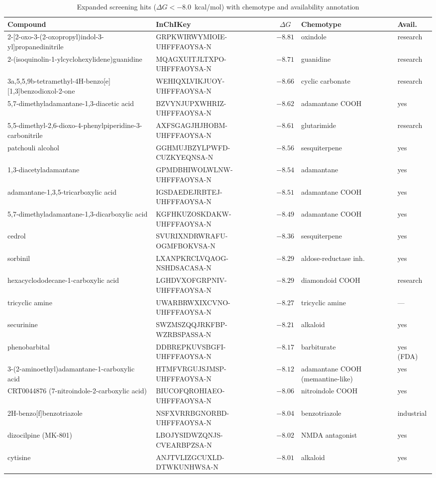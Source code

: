 \documentclass[pdflatex,sn-nature]{sn-jnl}
\begin{document}
\begin{table}[t]
\centering
\footnotesize
\caption{Expanded screening hits ($\Delta G < -8.0$~kcal/mol) with chemotype and availability annotation}
\label{tab:expanded}
\begin{tabular}{@{}p{4.6cm}p{3.6cm}cp{2.6cm}p{1.5cm}@{}}
\toprule
Compound & InChIKey & $\Delta G$ & Chemotype & Avail. \\
\midrule
2-[2-oxo-3-(2-oxopropyl)indol-3-yl]propanedinitrile & GRPKWIRWYMIOIE-UHFFFAOYSA-N & $-8.81$ & oxindole & research \\
2-(isoquinolin-1-ylcyclohexylidene)guanidine & MQAGXUITJLTXPO-UHFFFAOYSA-N & $-8.71$ & guanidine & research \\
3a,5,5,9b-tetramethyl-4H-benzo[e][1,3]benzodioxol-2-one & WEHIQXLVIKJUOY-UHFFFAOYSA-N & $-8.66$ & cyclic carbonate & research \\
5,7-dimethyladamantane-1,3-diacetic acid & BZVYNJUPXWHRIZ-UHFFFAOYSA-N & $-8.62$ & adamantane COOH & yes \\
5,5-dimethyl-2,6-dioxo-4-phenylpiperidine-3-carbonitrile & AXFSGAGJHJHOBM-UHFFFAOYSA-N & $-8.61$ & glutarimide & research \\
patchouli alcohol & GGHMUJBZYLPWFD-CUZKYEQNSA-N & $-8.56$ & sesquiterpene & yes \\
1,3-diacetyladamantane & GPMDBHIWOLWLNW-UHFFFAOYSA-N & $-8.54$ & adamantane & yes \\
adamantane-1,3,5-tricarboxylic acid & IGSDAEDEJRBTEJ-UHFFFAOYSA-N & $-8.51$ & adamantane COOH & yes \\
5,7-dimethyladamantane-1,3-dicarboxylic acid & KGFHKUZOSKDAKW-UHFFFAOYSA-N & $-8.49$ & adamantane COOH & yes \\
cedrol & SVURIXNDRWRAFU-OGMFBOKVSA-N & $-8.36$ & sesquiterpene & yes \\
sorbinil & LXANPKRCLVQAOG-NSHDSACASA-N & $-8.29$ & aldose-reductase inh. & yes \\
hexacyclododecane-1-carboxylic acid & LGHDVXOFGRPNIV-UHFFFAOYSA-N & $-8.29$ & diamondoid COOH & research \\
tricyclic amine & UWARBRWXIXCVNO-UHFFFAOYSA-N & $-8.27$ & tricyclic amine & --- \\
securinine & SWZMSZQQJRKFBP-WZRBSPASSA-N & $-8.21$ & alkaloid & yes \\
phenobarbital & DDBREPKUVSBGFI-UHFFFAOYSA-N & $-8.17$ & barbiturate & yes (FDA) \\
3-(2-aminoethyl)adamantane-1-carboxylic acid & HTMFVRGUJSJMSP-UHFFFAOYSA-N & $-8.12$ & adamantane COOH (memantine-like) & yes \\
CRT0044876 (7-nitroindole-2-carboxylic acid) & BIUCOFQROHIAEO-UHFFFAOYSA-N & $-8.06$ & nitroindole COOH & yes \\
2H-benzo[f]benzotriazole & NSFXVRRBGNORBD-UHFFFAOYSA-N & $-8.04$ & benzotriazole & industrial \\
dizocilpine (MK-801) & LBOJYSIDWZQNJS-CVEARBPZSA-N & $-8.02$ & NMDA antagonist & yes \\
cytisine & ANJTVLIZGCUXLD-DTWKUNHWSA-N & $-8.01$ & alkaloid & yes \\
\bottomrule
\end{tabular}
\end{table}
\end{document}
